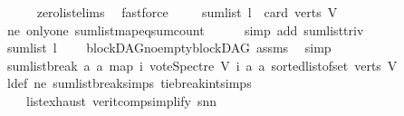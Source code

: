 \begin{isabellebody}
\ \ \ \ \isamarkupfalse%
\ zero{\isacharunderscore}{\kern0pt}list{\isachardot}{\kern0pt}elims{\isacharparenleft}{\kern0pt}{}{\isacharparenright}{\kern0pt}\ \isamarkupfalse%
\ fastforce\ \isanewline
\ \ \isamarkupfalse%
\ {\isachardoublequoteopen}sum{\isacharunderscore}{\kern0pt}list\ l\ {\isacharequal}{\kern0pt}\ card\ {\isacharparenleft}{\kern0pt}verts\ V{\isacharparenright}{\kern0pt}{\isachardoublequoteclose}\ \isamarkupfalse%
\ ne\ only{\isacharunderscore}{\kern0pt}one\ sum{\isacharunderscore}{\kern0pt}list{\isacharunderscore}{\kern0pt}map{\isacharunderscore}{\kern0pt}eq{\isacharunderscore}{\kern0pt}sum{\isacharunderscore}{\kern0pt}count\isanewline
\ \ \ \ \isamarkupfalse%
\ {\isacharparenleft}{\kern0pt}simp\ add{\isacharcolon}{\kern0pt}\ sum{\isacharunderscore}{\kern0pt}list{\isacharunderscore}{\kern0pt}triv{\isacharparenright}{\kern0pt}\isanewline
\ \ \isamarkupfalse%
\ \isamarkupfalse%
\ {\isachardoublequoteopen}sum{\isacharunderscore}{\kern0pt}list\ l\ {\isachargreater}{\kern0pt}\ {}{\isachardoublequoteclose}\ \isamarkupfalse%
\ blockDAG{\isachardot}{\kern0pt}no{\isacharunderscore}{\kern0pt}empty{\isacharunderscore}{\kern0pt}blockDAG\ assms{\isacharparenleft}{\kern0pt}{}{\isacharparenright}{\kern0pt}\ \isamarkupfalse%
\ simp\isanewline
\ \ \isamarkupfalse%
\ \isamarkupfalse%
\ {\isachardoublequoteopen}sumlist{\isacharunderscore}{\kern0pt}break\ a\ a\ {\isacharparenleft}{\kern0pt}map\ {\isacharparenleft}{\kern0pt}{\isasymlambda}i{\isachardot}{\kern0pt}\ vote{\isacharunderscore}{\kern0pt}Spectre\ V\ i\ a\ a{\isacharparenright}{\kern0pt}\ {\isacharparenleft}{\kern0pt}sorted{\isacharunderscore}{\kern0pt}list{\isacharunderscore}{\kern0pt}of{\isacharunderscore}{\kern0pt}set\ {\isacharparenleft}{\kern0pt}verts\ V{\isacharparenright}{\kern0pt}{\isacharparenright}{\kern0pt}{\isacharparenright}{\kern0pt}\ {\isacharequal}{\kern0pt}\ {}{\isachardoublequoteclose}\isanewline
\ \ \ \ \isamarkupfalse%
\ l{\isacharunderscore}{\kern0pt}def\ ne\ sumlist{\isacharunderscore}{\kern0pt}break{\isachardot}{\kern0pt}simps\ tie{\isacharunderscore}{\kern0pt}break{\isacharunderscore}{\kern0pt}int{\isachardot}{\kern0pt}simps\isanewline
\ \ \ \ list{\isachardot}{\kern0pt}exhaust\ verit{\isacharunderscore}{\kern0pt}comp{\isacharunderscore}{\kern0pt}simplify{}{\isacharparenleft}{\kern0pt}{}{\isacharparenright}{\kern0pt}\ snn\ \isamarkupfalse%

\end{isabellebody}
